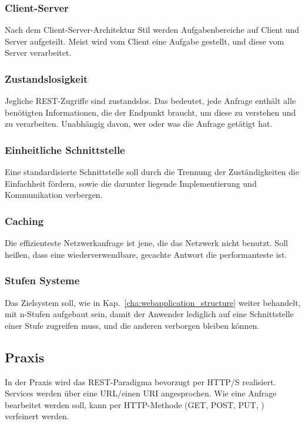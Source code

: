 \subsubsection{Client-Server}
Nach dem Client-Server-Architektur Stil werden Aufgabenbereiche auf Client und Server aufgeteilt. Meist wird vom Client eine Aufgabe gestellt, und diese vom Server verarbeitet. 
\subsubsection{Zustandslosigkeit}
Jegliche REST-Zugriffe sind zustandslos. Das bedeutet, jede Anfrage enthält alle benötigten Informationen, die der Endpunkt braucht, um diese zu verstehen und zu verarbeiten. Unabhängig davon, wer oder was die Anfrage getätigt hat.  
\subsubsection{Einheitliche Schnittstelle}
Eine standardisierte Schnittstelle soll durch die Trennung der Zuständigkeiten die Einfachheit fördern, sowie die darunter liegende Implementierung und Kommunikation verbergen. 
\subsubsection{Caching}
Die effizienteste Netzwerkanfrage ist jene, die das Netzwerk nicht benutzt.
Soll heißen, dass eine wiederverwendbare, gecachte Antwort die performanteste ist. 
\subsubsection{Stufen Systeme}
Das Zielsystem soll, wie in Kap.~\ref{cha:webapplication_structure} weiter behandelt, mit n-Stufen aufgebaut sein, damit der Anwender lediglich auf eine Schnittstelle einer Stufe zugreifen muss, und die anderen verborgen bleiben können.

\subsection{Praxis}
In der Praxis wird das REST-Paradigma bevorzugt per HTTP/S realisiert. Services werden über eine URL/einen URI angesprochen. Wie eine Anfrage bearbeitet werden soll, kann per HTTP-Methode (GET, POST, PUT, \etc) verfeinert werden. 